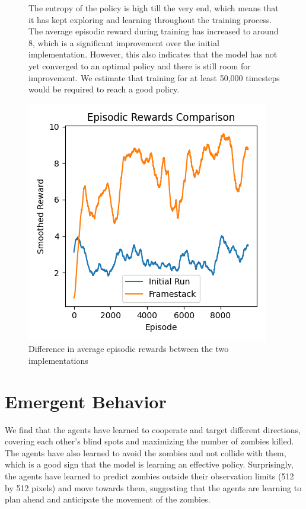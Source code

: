 \documentclass{article}
\begin{document}
\begin{figure}[h]
  \begin{minipage}[h]{0.5\linewidth}
    The entropy of the policy is high till the very end, which means that it has kept exploring and learning throughout the training process. 
    The average episodic reward during training has increased to around 8, which is a significant improvement over the initial implementation.
    However, this also indicates that the model has not yet converged to an optimal policy and there is still room for improvement. We estimate that 
    training for at least 50,000 timesteps would be required to reach a good policy.
  \end{minipage}
  \hspace{0.5cm}
  \begin{minipage}[h]{0.4\linewidth}
    \centering
    \includegraphics[scale=0.6]{combined_rewards.png}
    \caption{Difference in average episodic rewards between the two implementations}
    \label{fig:network_architecture}
  \end{minipage}
\end{figure}



\section{Emergent Behavior}
We find that the agents have learned to cooperate and target different directions, covering each other's blind spots and maximizing the number of zombies killed.
The agents have also learned to avoid the zombies and not collide with them, which is a good sign that the model is learning an effective policy.
Surprisingly, the agents have learned to predict zombies outside their observation limits (512 by 512 pixels) and move towards them, suggesting that the agents are learning to plan ahead and anticipate the movement of the zombies.
\end{document}
